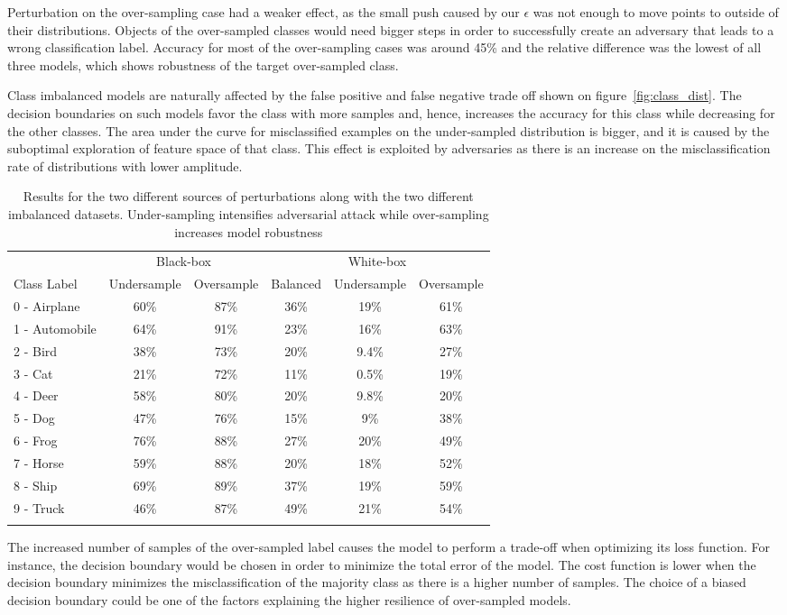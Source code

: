 \documentclass[runningheads,a4paper]{llncs}
\begin{document}
Perturbation on the over-sampling case had a weaker effect, as the small push caused by our $\epsilon$ was not enough to move points to outside of their distributions. Objects of the over-sampled classes would need bigger steps in order to successfully create an adversary that leads to a wrong classification label. Accuracy for most of the over-sampling cases was around 45\% and the relative difference was the lowest of all three models, which shows robustness of the target over-sampled class. 


Class imbalanced models are naturally affected by the false positive and false negative trade off shown on figure~\ref{fig:class_dist}. The decision boundaries on such models favor the class with more samples and, hence, increases the accuracy for this class while decreasing for the other classes. The area under the curve for misclassified examples on the under-sampled distribution is bigger, and it is caused by the suboptimal exploration of feature space of that class. This effect is exploited by adversaries as there is an increase on the misclassification rate of distributions with lower amplitude.
\begin{table}
	\centering	
	\begin{tabular}{lccccc}
		\toprule
		&\multicolumn{2}{c}{Black-box}
		&\multicolumn{3}{c}{White-box}
		\\\cmidrule(r){2-3}\cmidrule(l){4-6}
		Class Label &Undersample &Oversample &Balanced &Undersample &Oversample \\
		\midrule
		0 - Airplane &60\%& 87\% &36\%& 19\%    & 61\% \\
		1 - Automobile &64\%& 91\% &23\%& 16\%    & 63\% \\
		2 - Bird &38\%& 73\% &20\%& 9.4\%    & 27\% \\
		3 - Cat &21\%& 72\% &11\%& 0.5\%    & 19\% \\
		4 - Deer &58\%& 80\% &20\%& 9.8\%    & 20\% \\
		5 - Dog &47\%& 76\% &15\%& 9\%    & 38\% \\
		6 - Frog &76\%& 88\% &27\%& 20\%    & 49\% \\
		7 - Horse &59\%& 88\% &20\%& 18\%    & 52\% \\
		8 - Ship &69\%& 89\% &37\%& 19\%    & 59\% \\
		9 - Truck &46\%& 87\% &49\%& 21\%    & 54\% \\
		\bottomrule
		\hfill
	\end{tabular}
	\caption{Results for the two different sources of perturbations along with the two different imbalanced datasets. Under-sampling intensifies adversarial attack while over-sampling increases model robustness}
	\label{tbl:results}
\end{table}
The increased number of samples of the over-sampled label causes the model to perform a trade-off when optimizing its loss function. For instance, the decision boundary would be chosen in order to minimize the total error of the model. The cost function is lower when the decision boundary minimizes the misclassification of the majority class as there is a higher number of samples. The choice of a biased decision boundary could be one of the factors explaining the higher resilience of over-sampled models.
\end{document}

